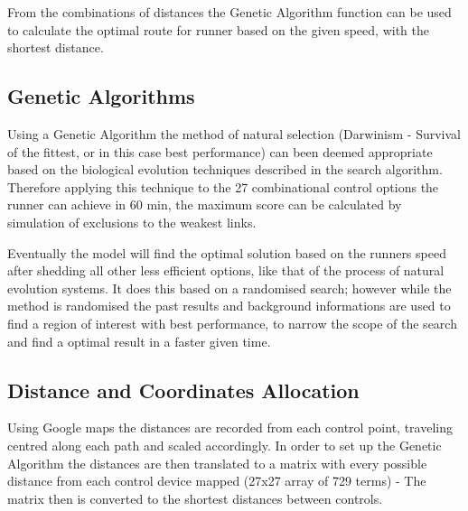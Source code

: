 \documentclass[a4paper, 10pt]{IEEEconf}
\begin{document}
From the combinations of distances the Genetic Algorithm function can be used to calculate the optimal route for runner based on the given speed, with the shortest distance.




\subsection{Genetic Algorithms}
Using a Genetic Algorithm the method of natural selection (Darwinism - Survival of the fittest, or in this case best performance) can been deemed appropriate based on the biological evolution techniques described in the search algorithm. Therefore applying this technique to the 27 combinational control options the runner can achieve in 60 min, the maximum score can be calculated by simulation of exclusions to the weakest links.

Eventually the model will find the optimal solution based on the runners speed after shedding all other less efficient options, like that of the process of natural evolution systems. It does this based on a randomised search; however while the method is randomised the past results and background informations are used to find a region of interest with best performance, to narrow the scope of the search and find a optimal result in a faster given time.


\subsection{Distance and Coordinates Allocation}

Using Google maps the distances are recorded from each control point, traveling centred along each path and scaled accordingly. In order to set up the Genetic Algorithm the distances are then translated to a matrix with every possible distance from each control device mapped (27x27 array of 729 terms) - The matrix then is converted to the shortest distances between controls.
\end{document}
